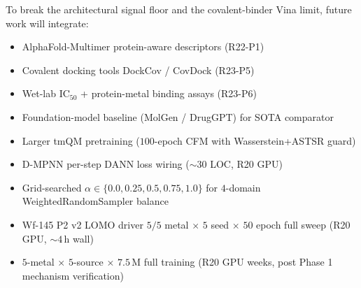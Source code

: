 To break the architectural signal floor and the covalent-binder Vina
limit, future work will integrate:
\begin{itemize}
  \item AlphaFold-Multimer protein-aware descriptors (R22-P1)
  \item Covalent docking tools DockCov / CovDock (R23-P5)
  \item Wet-lab IC$_{50}$ + protein-metal binding assays (R23-P6)
  \item Foundation-model baseline (MolGen / DrugGPT) for SOTA comparator
  \item Larger tmQM pretraining ($100$-epoch CFM with
        Wasserstein+ASTSR guard)
  \item D-MPNN per-step DANN loss wiring ($\sim 30$ LOC, R20 GPU)
  \item Grid-searched $\alpha \in \{0.0, 0.25, 0.5, 0.75, 1.0\}$ for
        $4$-domain WeightedRandomSampler balance
  \item Wf-145 P2 v2 LOMO driver $5/5$ metal $\times$ $5$ seed
        $\times$ $50$ epoch full sweep (R20 GPU, $\sim 4$\,h wall)
  \item $5$-metal $\times$ $5$-source $\times$ $7.5$\,M full training
        (R20 GPU weeks, post Phase 1 mechanism verification)
\end{itemize}